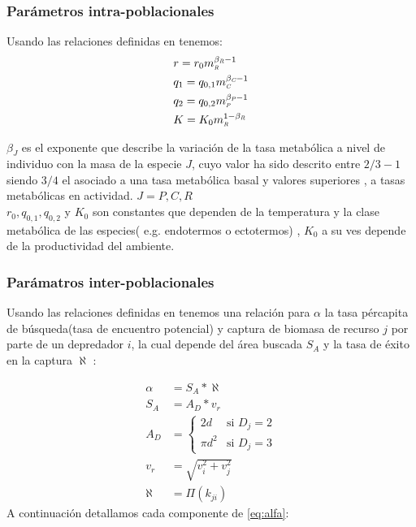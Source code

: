 \subsubsection{Par\'ametros intra-poblacionales}
Usando las relaciones definidas en \cite{savage2004effects} tenemos:
\begin{equation}\label{eq:params3}
\begin{aligned}
&r = r_0m_{\textit{\tiny R}}^{\beta_{\textit{\tiny R}} - 1} \\
&q_1=q_{0,1}m_{\textit{\tiny C}}^{\beta_{\textit{\tiny C}} - 1} \\
&q_2= q_{0,2}m_{\textit{\tiny P}}^{\beta_{\textit{\tiny P}} -1}\\
&K= K_{0}m_{\textit{\tiny R}}^{1-\beta_{\textit{\tiny R}}}
\end{aligned}
\end{equation}

$\beta_J$ es el exponente que describe la variaci\'on de la tasa metab\'olica a nivel de individuo con la masa de la especie $J$, cuyo valor ha sido descrito entre $2/3 - 1$ siendo $3/4$ el asociado a una tasa metab\'olica basal y valores superiores , a tasas metab\'olicas en actividad\citep{pawar2012dimensionality,west1997general,savage2004predominance}. $J = P,C,R$ \\
$r_0,q_{0,1},q_{0,2}$ y $K_0$ son constantes que dependen de la temperatura y la clase metab\'olica de las especies( e.g. endotermos o ectotermos) , $K_0$ a su ves depende de la productividad del ambiente\citep{pawar2012dimensionality}.
\subsubsection{Par\'amatros inter-poblacionales}
Usando las relaciones definidas en \citep{pawar2012dimensionality,kiltie2000scaling,mcgill2006allometric,bejan2006unifying} tenemos una relaci\'on para $\alpha$  la tasa p\'ercapita de b\'usqueda(tasa de encuentro potencial) y captura de biomasa de recurso $j$ por parte de un depredador $i$, la cual depende del \'area buscada $S_A$ y la tasa de \'exito en la captura $\aleph$ :  

\begin{equation}\label{eq:alfa}
\begin{aligned}
 \alpha & =  S_A*\aleph \\
 S_A &=  A_D * v_r \\
A_D &=  \begin{cases} 2d & \text{si } D_j = 2 \\ \pi d^2 & \text{si } D_j = 3 \end{cases}\\
v_r &= \sqrt{v_i^2 +v_j^2}\\
\aleph &= \Pi(k_{ji})
\end{aligned}
\end{equation}
A continuaci\'on detallamos cada componente de \eqref{eq:alfa}:\\

